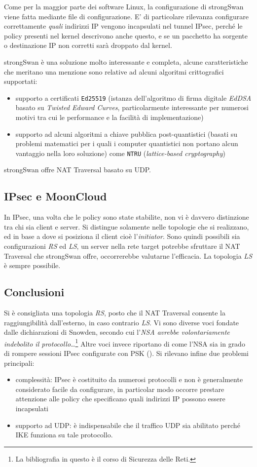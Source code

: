 Come per la maggior parte dei software Linux, la configurazione di strongSwan viene
fatta mediante file di configurazione.
E' di particolare rilevanza configurare correttamente \textit{quali} indirizzi IP vengono
incapsulati nel tunnel IPsec, perché le policy presenti nel kernel descrivono anche questo,
e se un pacchetto ha sorgente o destinazione IP non corretti sarà droppato dal kernel.

strongSwan è una soluzione molto interessante e completa, alcune caratteristiche
che meritano una menzione sono relative ad alcuni algoritmi crittografici supportati:
\begin{itemize}
  \item supporto a certificati \texttt{Ed25519} (istanza dell'algoritmo di firma digitale
  \textit{EdDSA} basato su \textit{Twisted Edward Curves},
  particolarmente interessante per numerosi motivi tra cui le
  performance e la facilità di implementazione)
  \item supporto ad alcuni algoritmi a chiave pubblica post-quantistici (basati su
  problemi matematici per i quali i computer quantistici non portano alcun vantaggio
  nella loro soluzione) come \texttt{NTRU} (\textit{lattice-based cryptography})
\end{itemize}
strongSwan offre NAT Traversal basato su UDP.


\subsection{IPsec e MoonCloud}
In IPsec, una volta
che le policy sono state stabilite, non vi è davvero distinzione tra chi sia client e server.
Si distingue solamente nelle topologie che si realizzano, ed in base a dove si posiziona il client cioè
l'\textit{initiator}.
Sono quindi possibili sia configurazioni \textit{RS} ed \textit{LS}, un server nella rete target
potrebbe sfruttare il NAT Traversal che strongSwan offre, occorrerebbe valutarne l'efficacia.
La topologia \textit{LS} è sempre possibile.


\subsection{Conclusioni}
Si è consigliata una topologia \textit{RS}, posto che il NAT Traversal consente
la raggiungibilità dall'esterno, in caso contrario \textit{LS}.
Vi sono diverse voci fondate dalle dichiarazioni di Snowden, secondo cui l'\textit{NSA avrebbe volontariamente
indebolito il protocollo}\ldots\footnote{La bibliografia in questo è il corso di Sicurezza delle Reti.}
Altre voci invece riportano di come l'NSA sia in grado di rompere sessioni IPsec
configurate con PSK (\cite{ipsec-nsa}).
Si rilevano infine due problemi principali:
\begin{itemize}
  \item complessità: IPsec è costituito da numerosi protocolli e non è generalmente considerato
  facile da configurare, in particolar modo occorre prestare attenzione alle policy che specificano
  quali indirizzi IP possono essere incapsulati
  \item supporto ad UDP: è indispensabile che il traffico UDP sia abilitato perché IKE funziona
  su tale protocollo.
\end{itemize}

